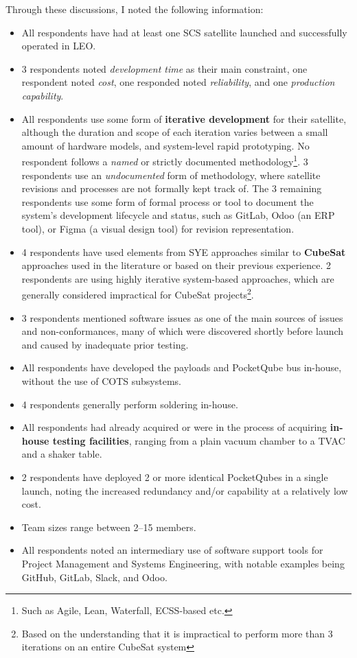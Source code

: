 \documentclass[a4paper,nobib,justified,final]{tufte-book}
\begin{document}
Through these discussions, I noted the following information:
\begin{itemize}[itemsep=-1ex]
	\item All respondents have had at least one \acs{SCS} satellite launched and successfully operated in \acs{LEO}.
	\item 3 respondents noted \emph{development time} as their main constraint, one respondent noted \emph{cost}, one responded noted \emph{reliability}, and one \emph{production capability}.
	\item All respondents use some form of \textbf{iterative development} for their satellite, although the duration and scope of each iteration varies between a small amount of hardware models, and system-level rapid prototyping. No respondent follows a \emph{named} or strictly documented methodology\footnote{Such as Agile, Lean, Waterfall, \acs{ECSS}-based etc.}. 3 respondents use an \emph{undocumented} form of methodology, where satellite revisions and processes are not formally kept track of. The 3 remaining respondents use some form of formal process or tool to document the system's development lifecycle and status, such as GitLab, Odoo (an \acs{ERP} tool), or Figma (a visual design tool) for revision representation.
	\item 4 respondents have used elements from \acs{SYE} approaches similar to \textbf{CubeSat} approaches used in the literature or based on their previous experience. %
	2 respondents are using highly iterative system-based approaches, which are generally considered impractical for CubeSat projects\footnote{Based on the understanding that it is impractical to perform more than 3 iterations on an entire CubeSat system}.
	\item 3 respondents mentioned software issues as one of the main sources of issues and non-conformances, many of which were discovered shortly before launch and caused by inadequate prior testing.
	\item All respondents have developed the payloads and PocketQube bus in-house, without the use of \acs{COTS} subsystems.
	\item 4 respondents generally perform soldering in-house.
	\item All respondents had already acquired or were in the process of acquiring \textbf{in-house testing facilities}, ranging from a plain vacuum chamber to a \acs{TVAC} and a shaker table.
	\item 2 respondents have deployed 2 or more identical PocketQubes in a single launch, noting the increased redundancy and/or capability at a relatively low cost.
	\item Team sizes range between 2--15 members.
	\item All respondents noted an intermediary use of software support tools for Project Management and Systems Engineering, with notable examples being GitHub, GitLab, Slack, and Odoo.
\end{itemize}
\end{document}
